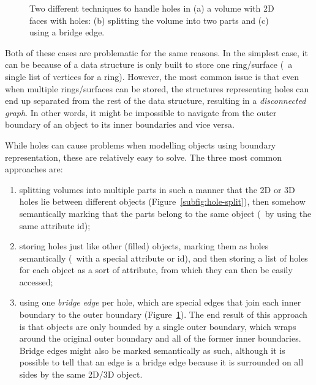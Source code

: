 \begin{figure}
\begin{subfigure}[b]{0.3\linewidth}
\caption{}%
\label{subfig:hole-bridge}
\end{subfigure}
\caption{Two different techniques to handle holes in (a) a volume with 2D faces with holes: (b) splitting the volume into two parts and (c) using a bridge edge.}%
\label{fig:hole}
\end{figure}

Both of these cases are problematic for the same reasons.
In the simplest case, it can be because of a data structure is only built to store one ring/surface (\eg\ a single list of vertices for a ring).
However, the most common issue is that even when multiple rings/surfaces can be stored, the structures representing holes can end up separated from the rest of the data structure, resulting in a \emph{disconnected graph}.
In other words, it might be impossible to navigate from the outer boundary of an object to its inner boundaries and vice versa.

While holes can cause problems when modelling objects using boundary representation, these are relatively easy to solve.
The three most common approaches are: 
\begin{enumerate}
	\item splitting volumes into multiple parts in such a manner that the 2D or 3D holes lie between different objects (Figure~\ref{subfig:hole-split}), then somehow semantically marking that the parts belong to the same object (\eg\ by using the same attribute id); 
	\item storing holes just like other (filled) objects, marking them as holes semantically (\eg\ with a special attribute or id), and then storing a list of holes for each object as a sort of attribute, from which they can then be easily accessed;
	\item using one \emph{bridge edge} per hole, which are special edges that join each inner boundary to the outer boundary (Figure~\ref{subfig:hole-bridge}).
	The end result of this approach is that objects are only bounded by a single outer boundary, which wraps around the original outer boundary and all of the former inner boundaries.
	Bridge edges might also be marked semantically as such, although it is possible to tell that an edge is a bridge edge because it is surrounded on all sides by the same 2D/3D object.
\end{enumerate}


